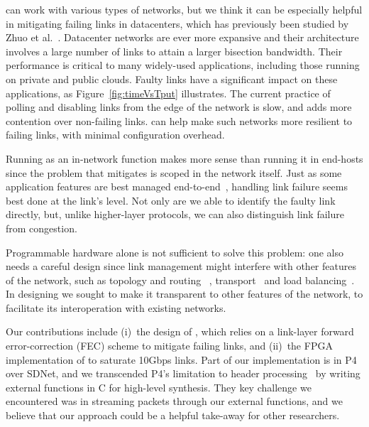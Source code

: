 \OurSys can work with various types of networks, but we think it can be
especially helpful in mitigating failing links in datacenters, which has
previously been studied by Zhuo et al.~\cite{Zhuo:2017:UMP:3098822.3098849}.
Datacenter networks are ever more expansive and their architecture involves a
large number of links to attain a larger bisection bandwidth. Their
performance is critical to many widely-used applications, including those
running on private and public clouds. Faulty  links have a significant impact
on these applications, as Figure~\ref{fig:timeVsTput}  illustrates. The
current practice of polling and disabling links from the edge of the network
is slow, and adds more contention over non-failing links. \OurSys can help
make such networks more resilient to failing links, with minimal configuration
overhead.

Running \OurSys as an in-network function makes more sense than
running it in end-hosts since the problem that \OurSys mitigates is
scoped in the network itself. Just as some application features are
best managed end-to-end~\cite{Saltzer84end-to-endarguments}, handling
link failure seems best done at the link's level. Not only are we able to
identify the faulty link directly, but, unlike higher-layer protocols,
we can also distinguish link failure from congestion.

Programmable hardware alone is not sufficient to solve this problem: one
also needs a careful design since link management might interfere with
other features of the network, such as topology and routing~
\cite{Greenberg:2011:VSF:1897852.1897877,
NiranjanMysore:2009:PSF:1594977.1592575,
Agarwal:2014:SMS:2620728.2620758},
transport~\cite{Raiciu:2011:IDP:2043164.2018467,Alizadeh:2010:DCT:1851275.1851192}
and load balancing~\cite{Alizadeh:2014:CDC:2740070.2626316}.
In designing \OurSys we sought to make it transparent to other
features of the network, to facilitate its interoperation with
existing networks.

Our contributions include (i)~the design of \OurSys, which relies on a
link-layer forward error-correction (FEC) scheme to mitigate failing
links, and (ii)~the FPGA implementation of \OurSys to saturate 10Gbps
links. Part of our implementation is in
P4~\cite{Bosshart:2014:PPP:2656877.2656890} over SDNet, and we
transcended P4's limitation to header processing~\cite{Dang:2017:WPL:3050220.3050231} by
writing external functions in C for high-level synthesis.
They key challenge we encountered was in streaming packets through our
external functions, and we believe that our approach could be a
helpful take-away for other researchers. 


